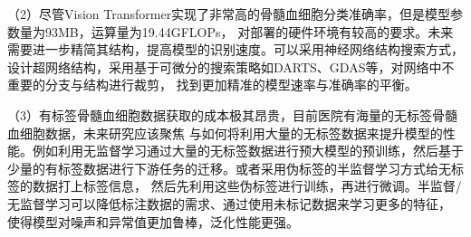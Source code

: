 （2）尽管Vision Transformer实现了非常高的骨髓血细胞分类准确率，但是模型参数量为93MB，运算量为19.44GFLOPs，
对部署的硬件环境有较高的要求。未来需要进一步精简其结构，提高模型的识别速度。可以采用神经网络结构搜索方式，
设计超网络结构，采用基于可微分的搜索策略如DARTS\cite{liu2018darts}、GDAS\cite{dong2019searching}等，对网络中不重要的分支与结构进行裁剪，
找到更加精准的模型速率与准确率的平衡。

（3）有标签骨髓血细胞数据获取的成本极其昂贵，目前医院有海量的无标签骨髓血细胞数据，未来研究应该聚焦
与如何将利用大量的无标签数据来提升模型的性能。例如利用无监督学习\cite{berry2019supervised}通过大量的无标签数据进行预大模型的预训练，然后基于
少量的有标签数据进行下游任务的迁移。或者采用伪标签的半监督学习\cite{ouali2020overview}方式给无标签的数据打上标签信息，
然后先利用这些伪标签进行训练，再进行微调。半监督/无监督学习可以降低标注数据的需求、通过使用未标记数据来学习更多的特征，
使得模型对噪声和异常值更加鲁棒，泛化性能更强。